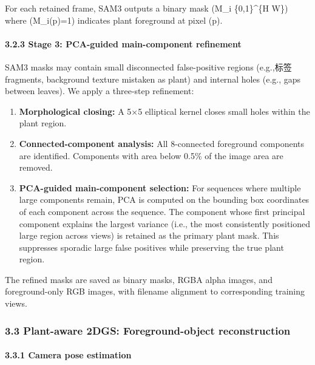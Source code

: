\documentclass[11pt,a4paper]{article}
\begin{document}
For each retained frame, SAM3 outputs a binary mask (M\_i
\in \{0,1\}\^{}\{H \times W\}) where (M\_i(p)=1) indicates plant
foreground at pixel (p).

\paragraph{3.2.3 Stage 3: PCA-guided main-component
refinement}\label{stage-3-pca-guided-main-component-refinement}

SAM3 masks may contain small disconnected false-positive regions
(e.g.,标签 fragments, background texture mistaken as plant) and internal
holes (e.g., gaps between leaves). We apply a three-step refinement:

\begin{enumerate}
\def\labelenumi{\arabic{enumi}.}
\tightlist
\item
  \textbf{Morphological closing:} A 5×5 elliptical kernel closes small
  holes within the plant region.
\item
  \textbf{Connected-component analysis:} All 8-connected foreground
  components are identified. Components with area below 0.5\% of the
  image area are removed.
\item
  \textbf{PCA-guided main-component selection:} For sequences where
  multiple large components remain, PCA is computed on the bounding box
  coordinates of each component across the sequence. The component whose
  first principal component explains the largest variance (i.e., the
  most consistently positioned large region across views) is retained as
  the primary plant mask. This suppresses sporadic large false positives
  while preserving the true plant region.
\end{enumerate}

The refined masks are saved as binary masks, RGBA alpha images, and
foreground-only RGB images, with filename alignment to corresponding
training views.

\subsubsection{3.3 Plant-aware 2DGS: Foreground-object
reconstruction}\label{plant-aware-2dgs-foreground-object-reconstruction}

\paragraph{3.3.1 Camera pose estimation}\label{camera-pose-estimation}
\end{document}
